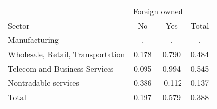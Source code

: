 \begin{tabular}{l*{3}{c}}
\toprule
 & \multicolumn{2}{c}{Foreign owned} & \\
\cmidrule(lr){2-3}
Sector & No & Yes & Total \\
\midrule
Manufacturing & . & . & . \\
Wholesale, Retail, Transportation & 0.178 & 0.790 & 0.484 \\
Telecom and Business Services & 0.095 & 0.994 & 0.545 \\
Nontradable services & 0.386 & -0.112 & 0.137 \\
\midrule
Total & 0.197 & 0.579 & 0.388 \\
\bottomrule
\end{tabular}

